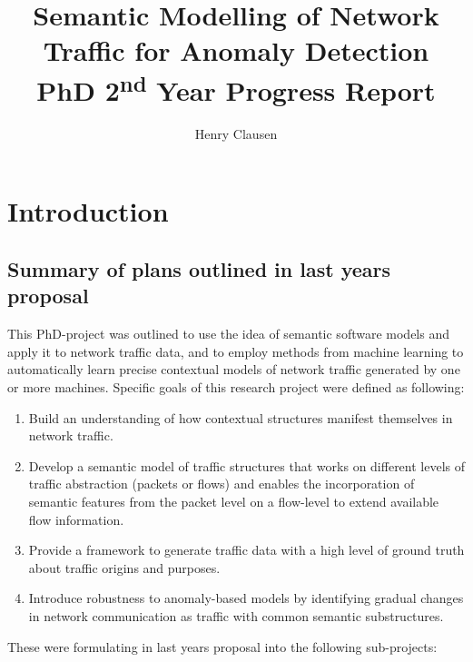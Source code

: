 \documentclass[a4paper,12pt,twoside]{article}
\makeatletter
\newcommand*{\toccontents}{\@starttoc{toc}}
\makeatother
\begin{document}
\title{\LARGE {\bf Semantic Modelling of Network Traffic for Anomaly Detection}\\
PhD 2\textsuperscript{nd} Year Progress Report
 \vspace*{-5mm}
}
\author{Henry Clausen}

\maketitle



\toccontents


\section{Introduction}

\subsection{Summary of plans outlined in last years proposal}
This PhD-project was outlined to use the idea of semantic software models and apply it to network traffic data, and to employ methods from machine learning to automatically learn precise contextual models of network traffic generated by one or more machines. Specific goals of this research project were defined as following:
\begin{enumerate}

\item Build an understanding of how contextual structures manifest themselves in network traffic.
\item Develop a semantic model of traffic structures that works on different levels of traffic abstraction (packets or flows) and enables the incorporation of semantic features from the packet level on a flow-level to extend available flow information.
\item Provide a framework to generate traffic data with a high level of ground truth about traffic origins and purposes.
\item Introduce robustness to anomaly-based models by identifying gradual changes in network communication as traffic with common semantic substructures.

\end{enumerate}

These were formulating in last years proposal into the following sub-projects:
\end{document}
